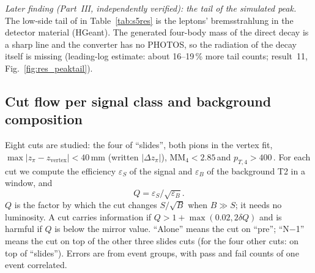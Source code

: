 \emph{Later finding (Part~III, independently verified): the tail of the simulated peak.} The low-side tail of \Mfour in
Table~\ref{tab:s5res} is the leptons' bremsstrahlung in the detector material (HGeant). The generated four-body mass of the
direct decay is a sharp line and the converter has no PHOTOS, so the radiation of the decay itself is missing (leading-log
estimate: about 16--19\,\% more tail counts; result~11, Fig.~\ref{fig:res_peaktail}).


\subsection{Cut flow per signal class and background composition}
\label{sec:s5cut}
Eight cuts are studied: the four of ``slides'', both pions in the vertex fit,
$\max|z_\pi-z_{\mathrm{vertex}}|<40$\,mm (written $|\Delta z_\pi|$), $\mathrm{MM}_4<2.85$\,\GeVcc and
$p_{T,4}>400$\,\MeVc. For each cut we compute the efficiency $\varepsilon_S$ of the signal and
$\varepsilon_B$ of the background T2 in a window, and
\begin{equation}
Q = \varepsilon_S/\sqrt{\varepsilon_B}.
\end{equation}
$Q$ is the factor by which the cut changes $S/\sqrt{B}$ when $B\gg S$; it needs no luminosity. A cut
carries information if $Q > 1 + \max(0.02, 2\delta Q)$ and is harmful if $Q$ is below the mirror
value. ``Alone'' means the cut on ``pre''; ``N$-$1'' means the cut on top of the other three slides
cuts (for the four other cuts: on top of ``slides''). Errors are from event groups, with pass and
fail counts of one event correlated.

